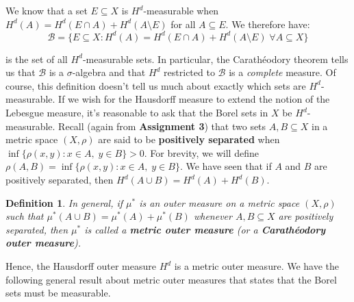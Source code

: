 \documentclass{article}[11pt]
\theoremstyle{dotless}
\newtheorem{defn}[thm]{Definition}
\begin{document}
We know that a set $E \subseteq X$ is $H^d$-measurable when $H^d(A) = H^d(E \cap A) + H^d(A \setminus E)$
for all $A \subseteq E$. We therefore have: 
\[ \mathcal{B} = \{ E \subseteq X : H^d(A) = H^d(E \cap A) + H^d(A \setminus E) \; \forall A \subseteq X \} \]

\noindent
is the set of all $H^d$-measurable sets. In particular, the Carath\'{e}odory theorem tells us that $\mathcal{B}$ is a $\sigma$-algebra
and that $H^d$ restricted to $\mathcal{B}$ is a \textit{complete} measure. Of course, this definition doesn't tell us much about exactly 
which sets are $H^d$-measurable. If we wish for the Hausdorff measure to extend the notion of the Lebesgue measure, it's reasonable
to ask that
the Borel sets in $X$ be $H^d$-measurable. Recall (again from \textbf{Assignment 3}) that two sets $A, B \subseteq X$ in
a metric space $(X,\rho)$ are said to be \textbf{positively separated} when $\inf \{ \rho(x,y) : x \in A, \; y \in B \} > 0$.
For brevity, we will define $\rho(A,B) = \inf \{ \rho(x,y) : x \in A, \; y \in B \}$. We have seen that if $A$ and $B$ are
positively separated, then $H^d(A \cup B) = H^d(A) + H^d(B)$.

\begin{defn}
	In general, if $\mu^*$ is an outer measure on a metric space $(X, \rho)$ such that $\mu^*(A \cup B) = \mu^*(A) + \mu^*(B)$
	whenever $A, B \subseteq X$ are positively separated, then $\mu^*$ is called a \textbf{metric outer measure} (or a 
	\textbf{Carath\'{e}odory outer measure}).
\end{defn}
\bigskip

Hence, the Hausdorff outer measure $H^d$ is a metric outer measure. We have the following general result about metric outer
measures that states that the Borel sets must be measurable.
\end{document}
